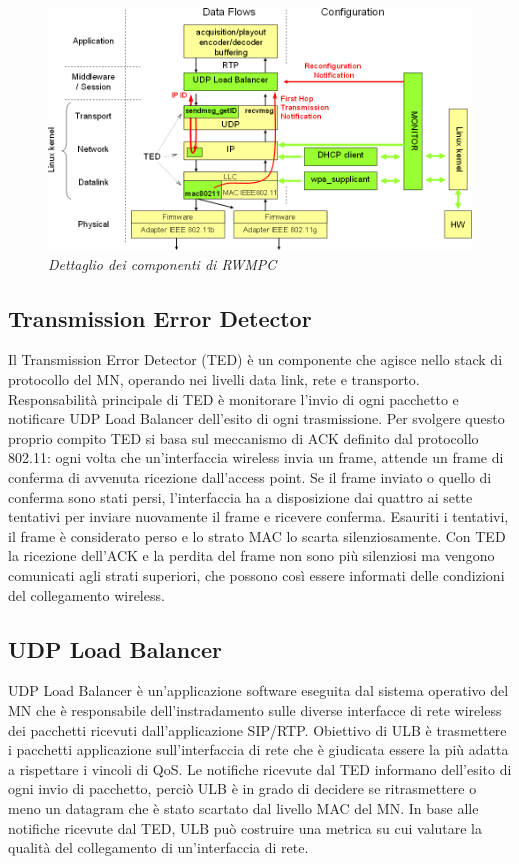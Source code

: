 \documentclass[12pt,a4paper,openright,twoside]{book}
\begin{document}
\begin{figure}[tb]
  \centering
  \includegraphics[width=\textwidth]{img/abps-rwmpc-funzionamento}
  \caption{\em Dettaglio dei componenti di RWMPC}
  \label{fig:abps:rwmpc-funzionamento}
\end{figure}

\subsection{Transmission Error Detector}

Il Transmission Error Detector (TED) è un componente che agisce nello
stack di protocollo del MN, operando nei livelli data link, rete e
transporto. Responsabilità principale di TED è monitorare l'invio di
ogni pacchetto e notificare UDP Load Balancer dell'esito di ogni
trasmissione. Per svolgere questo proprio compito TED si basa sul
meccanismo di ACK definito dal protocollo 802.11: ogni volta che
un'interfaccia wireless invia un frame, attende un frame di conferma
di avvenuta ricezione dall'access point. Se il frame inviato o quello
di conferma sono stati persi, l'interfaccia ha a disposizione dai
quattro ai sette tentativi per inviare nuovamente il frame e ricevere
conferma. Esauriti i tentativi, il frame è considerato perso e lo
strato MAC lo scarta silenziosamente. Con TED la ricezione dell'ACK e
la perdita del frame non sono più silenziosi ma vengono comunicati
agli strati superiori, che possono così essere informati delle
condizioni del collegamento wireless.

\subsection{UDP Load Balancer}

UDP Load Balancer è un'applicazione software eseguita dal sistema
operativo del MN che è responsabile dell'instradamento sulle diverse
interfacce di rete wireless dei pacchetti ricevuti dall'applicazione
SIP/RTP. Obiettivo di ULB è trasmettere i pacchetti applicazione
sull'interfaccia di rete che è giudicata essere la più adatta a
rispettare i vincoli di QoS. Le notifiche ricevute dal TED informano
dell'esito di ogni invio di pacchetto, perciò ULB è in grado di
decidere se ritrasmettere o meno un datagram che è stato scartato dal
livello MAC del MN. In base alle notifiche ricevute dal TED, ULB può
costruire una metrica su cui valutare la qualità del collegamento di
un'interfaccia di rete.
\end{document}
